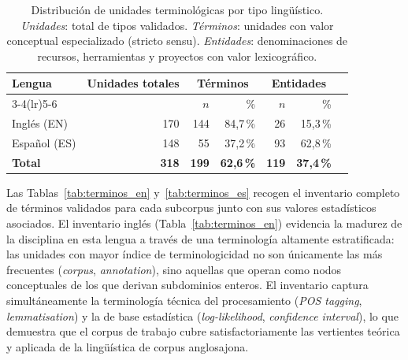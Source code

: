\begin{table}[H]
\centering
\small
\caption{Distribución de unidades terminológicas por tipo lingüístico.
         \textit{Unidades}: total de tipos validados.
         \textit{Términos}: unidades con valor conceptual especializado (stricto sensu).
         \textit{Entidades}: denominaciones de recursos, herramientas y proyectos con valor lexicográfico.}
\label{tab:terminos_vs_entidades}
\begin{tabular}{@{} l r r r r r r @{}}
\toprule
\textbf{Lengua} & \textbf{Unidades totales} & \multicolumn{2}{c}{\textbf{Términos}} & \multicolumn{2}{c}{\textbf{Entidades}} \\
\cmidrule(lr){3-4}\cmidrule(lr){5-6}
 & & $n$ & \% & $n$ & \% \\
\midrule
Inglés (EN) & 170 & 144 & 84{,}7\,\% & 26 & 15{,}3\,\% \\
Español (ES) & 148 & 55 & 37{,}2\,\% & 93 & 62{,}8\,\% \\
\midrule
\textbf{Total} & \textbf{318} & \textbf{199} & \textbf{62{,}6\,\%} & \textbf{119} & \textbf{37{,}4\,\%} \\
\bottomrule
\end{tabular}
\end{table}

Las Tablas~\ref{tab:terminos_en} y~\ref{tab:terminos_es} recogen el
inventario completo de términos validados para cada subcorpus junto con
sus valores estadísticos asociados. El inventario inglés
(Tabla~\ref{tab:terminos_en}) evidencia la madurez de la disciplina en
esta lengua a través de una terminología altamente estratificada: las
unidades con mayor índice de terminologicidad no son únicamente las más
frecuentes (\textit{corpus}, \textit{annotation}), sino aquellas que
operan como nodos conceptuales de los que derivan subdominios enteros.
El inventario captura simultáneamente la terminología técnica del
procesamiento (\textit{POS tagging}, \textit{lemmatisation}) y la de
base estadística (\textit{log-likelihood}, \textit{confidence interval}),
lo que demuestra que el corpus de trabajo cubre satisfactoriamente las
vertientes teórica y aplicada de la lingüística de corpus anglosajona.

